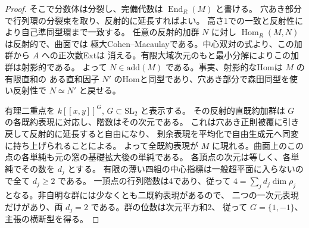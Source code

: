 \begin{proof}
そこで分数体は分裂し、完備代数は $\operatorname{End}_R(M)$ と書ける。
穴あき部分で行列環の分裂束を取り、反射的に延長すればよい。
高さ1での一致と反射性により自己準同型環まで一致する。
任意の反射的加群 $N$ に対し $\operatorname{Hom}_R(M,N)$ は反射的で、曲面では
極大Cohen--Macaulayである。中心双対の式より、この加群から $A$ への正次数Extは
消える。有限大域次元のもと最小分解によりこの加群は射影的である。
よって $N\in\mathrm{add}(M)$ である。事実、射影的なHomは $M$ の有限直和の
ある直和因子 $N'$ のHomと同型であり、穴あき部分で森田同型を使い反射性で $N\simeq N'$ と戻せる。

有理二重点を $k[[x,y]]^G$, $G\subset\mathrm{SL}_2$ と表示する。
その反射的直既約加群は $G$ の各既約表現に対応し、階数はその次元である。
これは穴あき正則被覆に引き戻して反射的に延長すると自由になり、
剰余表現を平均化で自由生成元へ同変に持ち上げられることによる。
よって全既約表現が $M$ に現れる。曲面上のこの点の各単純も元の窓の基礎拡大後の単純である。
各頂点の次元は等しく、各単純でその数を $d_j$ とする。
有限の薄い四組の中心指標は一般超平面に入らないので全て $d_j\ge2$ である。
一頂点の行列階数は4であり、従って
$4=\sum_j d_j\dim\rho_j$ となる。非自明な群には少なくとも二既約表現があるので、
二つの一次元表現だけがあり、両 $d_j=2$ である。群の位数は次元平方和2、
従って $G=\{1,-1\}$、主張の横断型を得る。
\end{proof}
